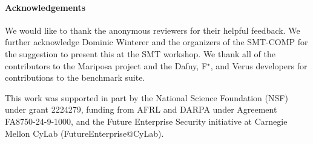 \documentclass[
]{ceurart}
\newcommand{\fstar}{F${}^\star$\xspace}
\begin{document}
\paragraph{Acknowledgements} We would like to thank the anonymous reviewers for their helpful feedback. We further acknowledge Dominic Winterer and the organizers of the SMT-COMP for the suggestion to present this at the SMT workshop. We thank all of the contributors to the Mariposa project and the Dafny, \fstar, and Verus developers for contributions to the benchmark suite.

This work was supported in part by the National Science
Foundation (NSF) under grant 2224279, funding from AFRL
and DARPA under Agreement FA8750-24-9-1000, and the
Future Enterprise Security initiative at Carnegie Mellon CyLab
(FutureEnterprise@CyLab).



\end{document}
